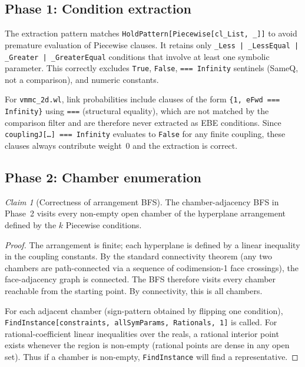 \documentclass[12pt,a4paper]{article}
\theoremstyle{critical}
\theoremstyle{remark}
\newtheorem{claim}{Claim}
\theoremstyle{verified}
\begin{document}
\subsection{Phase 1: Condition extraction}

The extraction pattern matches \texttt{HoldPattern[Piecewise[cl\_List, \_]]} to
avoid premature evaluation of Piecewise clauses.  It retains only
\texttt{\_Less | \_LessEqual | \_Greater | \_GreaterEqual} conditions that
involve at least one symbolic parameter.  This correctly excludes \texttt{True},
\texttt{False}, \texttt{=== Infinity} sentinels (SameQ, not a comparison), and
numeric constants.

For \texttt{vmmc\_2d.wl}, link probabilities include clauses of the form
\texttt{\{1, eFwd === Infinity\}} using \texttt{===} (structural equality), which
are not matched by the comparison filter and are therefore never extracted as EBE
conditions.  Since \texttt{couplingJ[\ldots] === Infinity} evaluates to
\texttt{False} for any finite coupling, these clauses always contribute weight~0
and the extraction is correct.

\subsection{Phase 2: Chamber enumeration}

\begin{claim}[Correctness of arrangement BFS]
The chamber-adjacency BFS in Phase~2 visits every non-empty open chamber of the
hyperplane arrangement defined by the $k$ Piecewise conditions.
\end{claim}

\begin{proof}
The arrangement is finite; each hyperplane is defined by a linear inequality in
the coupling constants.  By the standard connectivity theorem (any two chambers
are path-connected via a sequence of codimension-1 face crossings), the
face-adjacency graph is connected.  The BFS therefore visits every chamber
reachable from the starting point.  By connectivity, this is all chambers.

For each adjacent chamber (sign-pattern obtained by flipping one condition),
\texttt{FindInstance[constraints, allSymParams, Rationals, 1]} is called.  For
rational-coefficient linear inequalities over the reals, a rational interior
point exists whenever the region is non-empty (rational points are dense in any
open set).  Thus if a chamber is non-empty, \texttt{FindInstance} will find a
representative.
\end{proof}
\end{document}
